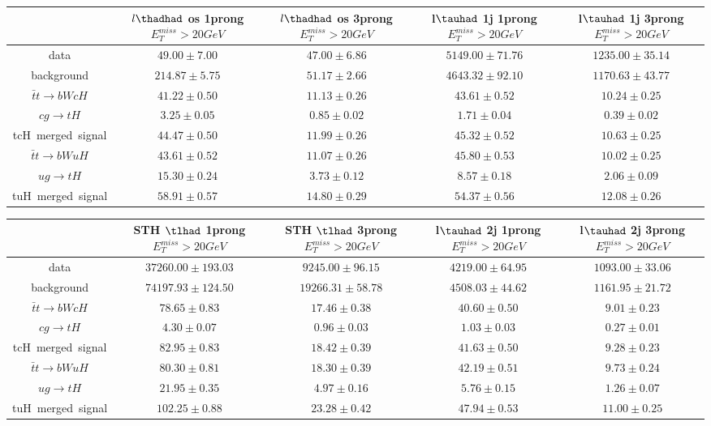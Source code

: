 \centering
\begin{tabular}{|c|c|c|c|c|} \hline
 & $l\thadhad$ os 1prong  $E_T^{miss}>20GeV$ & $l\thadhad$ os 3prong  $E_T^{miss}>20GeV$ & l$\tauhad$ 1j 1prong  $E_T^{miss}>20GeV$ & l$\tauhad$ 1j 3prong  $E_T^{miss}>20GeV$\\\hline
data & $49.00\pm7.00$ & $47.00\pm6.86$ & $5149.00\pm71.76$ & $1235.00\pm35.14$\\\hline
background & $214.87\pm5.75$ & $51.17\pm2.66$ & $4643.32\pm92.10$ & $1170.63\pm43.77$\\\hline
$\bar{t}t\to bWcH$ & $41.22\pm0.50$ & $11.13\pm0.26$ & $43.61\pm0.52$ & $10.24\pm0.25$\\\hline
$cg\to tH$ & $3.25\pm0.05$ & $0.85\pm0.02$ & $1.71\pm0.04$ & $0.39\pm0.02$\\\hline
tcH~merged~signal & $44.47\pm0.50$ & $11.99\pm0.26$ & $45.32\pm0.52$ & $10.63\pm0.25$\\\hline
$\bar{t}t\to bWuH$ & $43.61\pm0.52$ & $11.07\pm0.26$ & $45.80\pm0.53$ & $10.02\pm0.25$\\\hline
$ug\to tH$ & $15.30\pm0.24$ & $3.73\pm0.12$ & $8.57\pm0.18$ & $2.06\pm0.09$\\\hline
tuH~merged~signal & $58.91\pm0.57$ & $14.80\pm0.29$ & $54.37\pm0.56$ & $12.08\pm0.26$\\\hline
\end{tabular}
\begin{tabular}{|c|c|c|c|c|} \hline
 & STH $\tlhad$  1prong  $E_T^{miss}>20GeV$ & STH $\tlhad$  3prong  $E_T^{miss}>20GeV$ & l$\tauhad$ 2j 1prong  $E_T^{miss}>20GeV$ & l$\tauhad$ 2j 3prong  $E_T^{miss}>20GeV$\\\hline
data & $37260.00\pm193.03$ & $9245.00\pm96.15$ & $4219.00\pm64.95$ & $1093.00\pm33.06$\\\hline
background & $74197.93\pm124.50$ & $19266.31\pm58.78$ & $4508.03\pm44.62$ & $1161.95\pm21.72$\\\hline
$\bar{t}t\to bWcH$ & $78.65\pm0.83$ & $17.46\pm0.38$ & $40.60\pm0.50$ & $9.01\pm0.23$\\\hline
$cg\to tH$ & $4.30\pm0.07$ & $0.96\pm0.03$ & $1.03\pm0.03$ & $0.27\pm0.01$\\\hline
tcH~merged~signal & $82.95\pm0.83$ & $18.42\pm0.39$ & $41.63\pm0.50$ & $9.28\pm0.23$\\\hline
$\bar{t}t\to bWuH$ & $80.30\pm0.81$ & $18.30\pm0.39$ & $42.19\pm0.51$ & $9.73\pm0.24$\\\hline
$ug\to tH$ & $21.95\pm0.35$ & $4.97\pm0.16$ & $5.76\pm0.15$ & $1.26\pm0.07$\\\hline
tuH~merged~signal & $102.25\pm0.88$ & $23.28\pm0.42$ & $47.94\pm0.53$ & $11.00\pm0.25$\\\hline
\end{tabular}
